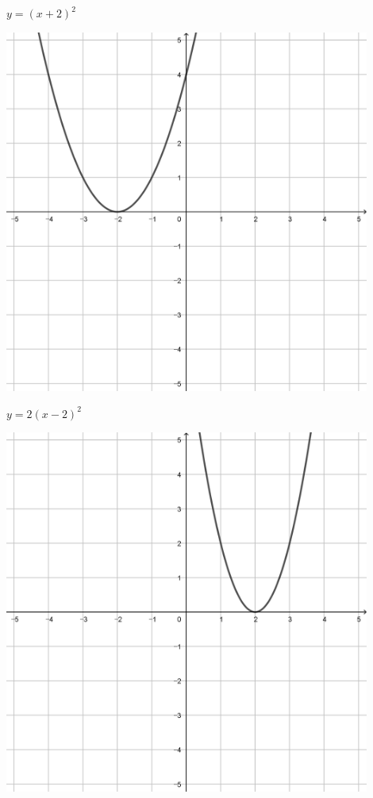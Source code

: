 \documentclass[a4paper]{oblivoir}
\begin{document}
\begin{minipage}{0.45\textwidth}\centering
\(y=(x+2)^2\)
\par\bigskip\includegraphics[width=0.9\textwidth]{img/2_quadratic_15}
\end{minipage}
\begin{minipage}{0.45\textwidth}\centering
\(y=2(x-2)^2\)
\par\bigskip\includegraphics[width=0.9\textwidth]{img/2_quadratic_16}
\end{minipage}\bigskip\bigskip\par
\end{document}
